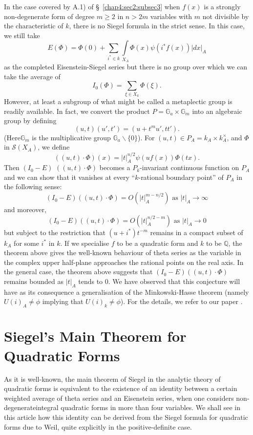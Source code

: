 In the case covered by A.1) of \S\ \ref{chap4:sec2:subsec3} \ie when $f(x)$ is a
strongly non-degenerate form of degree $m\geq 2$ in $n>2m$ variables
with $m$ not divisible by the characteristic of $k$, there is no
Siegel formula in the strict sense. In this case, we still take
$$
E(\Phi)=\Phi(0)+\sum_{i^{\ast}\in
  k}\int\limits_{X_{A}}\Phi(x)\psi(i^{\ast}f(x))|dx|_{A} 
$$
as the completed Eisenstein-Siegel series but there is no group over
which we can take the average of
$$
I_{0}(\Phi)=\sum_{\xi\in X_{k}}\Phi(\xi).
$$
However, at least a subgroup of what might be called a metaplectic
group is readily available. In fact, we convert the product
$P=\mathbb{G}_{a}\times \mathbb{G}_{m}$ into an algebraic group by
defining
$$
(u,t)(u',t')=(u+t^{m}u',tt').
$$
(Here\pageoriginale $\mathbb{G}_{m}$ is the multiplicative group
$\mathbb{G}_{a}\backslash \{0\}$). For $(u,t)\in P_{A}=k_{A}\times
k^{\times}_{A}$, and $\Phi$ in $\mathscr{S}(X_{A})$, we define
$$
((u,t)\cdot \Phi)(x)=|t|^{n/2}_{A}\psi(uf(x))\Phi(tx).
$$
Then $(I_{0}-E)$ $((u,t)\cdot\Phi)$ becomes a $P_{k}$-invariant
continuous function on $P_{A}$ and we can show that it vanishes at
every ``$k$-rational boundary point'' of $P_{A}$ in the following
sense:
$$
(I_{0}-E)((u,t)\cdot\Phi)=O(|t|^{m-n/2}_{A})\text{ \  as \ }
|t|_{A}\to \infty
$$
and moreover,
$$
(I_{0}-E)((u,t)\cdot\Phi)=O(|t|^{n/2-m}_{A})\text{ \ as \ } |t|_{A}\to
0
$$
but subject to the restriction that $(u+i^{\ast})t^{-m}$ remains in a
compact subset of $k_{A}$ for some $i^{\ast}$ in $k$. If we specialise
$f$ to be a quadratic form and $k$ to be $\mathbb{Q}$, the theorem
above gives the well-known behaviour of theta series as the variable
in the complex upper half-plane approaches the rational points on the
real axis. In the general case, the theorem above suggests that
$(I_{0}-E)((u,t)\cdot\Phi)$ remains bounded as $|t|_{A}$ tends to
$0$. We have observed that this conjecture will have as its
consequence a generalisation of the Minkowski-Hasse theorem (namely
$U(i)_{A}\neq \phi$ implying that $U(i)_{k}\neq\phi$). For the
details, we refer to our paper \cite{Igu 5}.

\section{Siegel's Main Theorem for Quadratic
  Forms}\label{chap4:sec5}  %

As it is well-known, the main theorem of Siegel in the analytic theory
of quadratic forms is equivalent to the existence of an identity
between a certain weighted average of theta series and an Eisenstein
series, when one considers non-degenerate\pageoriginale integral
quadratic forms in more than four variables. We shall see in this
article how this identity can be derived from the Siegel formula for
quadratic forms due to Weil, quite explicitly in the positive-definite
case.

